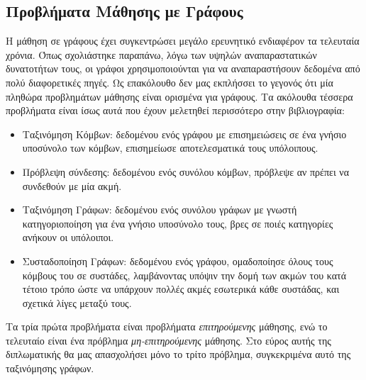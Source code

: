\subsection{Προβλήματα Μάθησης με Γράφους}
Η μάθηση σε γράφους έχει συγκεντρώσει μεγάλο ερευνητικό ενδιαφέρον τα τελευταία χρόνια.
Όπως σχολιάστηκε παραπάνω, λόγω των υψηλών αναπαραστατικών δυνατοτήτων τους, οι γράφοι χρησιμοποιούνται για να αναπαραστήσουν δεδομένα από πολύ διαφορετικές πηγές.
Ως επακόλουθο δεν μας εκπλήσσει το γεγονός ότι μία πληθώρα προβλημάτων μάθησης είναι ορισμένα για γράφους.
Τα ακόλουθα τέσσερα προβλήματα είναι ίσως αυτά που έχουν μελετηθεί περισσότερο στην βιβλιογραφία:
\begin{itemize}
\item Ταξινόμηση Κόμβων: δεδομένου ενός γράφου με επισημειώσεις σε ένα γνήσιο υποσύνολο των κόμβων, επισημείωσε αποτελεσματικά τους υπόλοιπους.
\item Πρόβλεψη σύνδεσης: δεδομένου ενός συνόλου κόμβων, πρόβλεψε αν πρέπει να συνδεθούν με μία ακμή.
\item Ταξινόμηση Γράφων: δεδομένου ενός συνόλου γράφων με γνωστή κατηγοριοποίηση για ένα γνήσιο υποσύνολο τους, βρες σε ποιές κατηγορίες ανήκουν οι υπόλοιποι.
\item Συσταδοποίηση Γράφων: δεδομένου ενός γράφου, ομαδοποίησε όλους τους κόμβους του σε συστάδες, λαμβάνοντας υπόψιν την δομή των ακμών του κατά τέτοιο τρόπο ώστε να υπάρχουν πολλές ακμές εσωτερικά κάθε συστάδας, και σχετικά λίγες μεταξύ τους.
\end{itemize}
Τα τρία πρώτα προβλήματα είναι προβλήματα \textit{επιτηρούμενης} μάθησης, ενώ το τελευταίο είναι ένα πρόβλημα \textit{μη-επιτηρούμενης} μάθησης.
Στο εύρος αυτής της διπλωματικής θα μας απασχολήσει μόνο το τρίτο πρόβλημα, συγκεκριμένα αυτό της ταξινόμησης γράφων.
